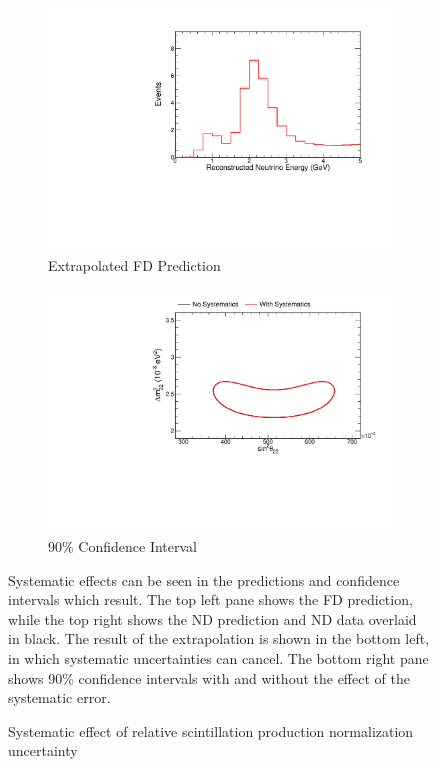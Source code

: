 {\begin{figure}
\begin{center}
\begin{subfigure}[c]{0.49\textwidth}
\includegraphics[width=\textwidth]{figures/systs/prediction/fd_extrap_prediction_birksNormRel.pdf}
\caption*{Extrapolated FD Prediction}
\end{subfigure}
\begin{subfigure}[c]{0.49\textwidth}
\includegraphics[width=\textwidth]{figures/systs/prediction/fd_extrap_contour_birksNormRel.pdf}
\caption*{90\% Confidence Interval}
\end{subfigure}
\end{center}
\caption{Systematic effect of relative scintillation production normalization uncertainty}{
Systematic effects can be seen in the predictions and confidence intervals
which result.
The top left pane shows the FD prediction, while the top right shows the
ND prediction and ND data overlaid in black.
The result of the extrapolation is shown in the bottom left, in which
systematic uncertainties can cancel.
The bottom right pane shows 90\% confidence intervals with and without
the effect of the systematic error.}
\label{syst_fig_birksNormRel}


\end{figure}}
